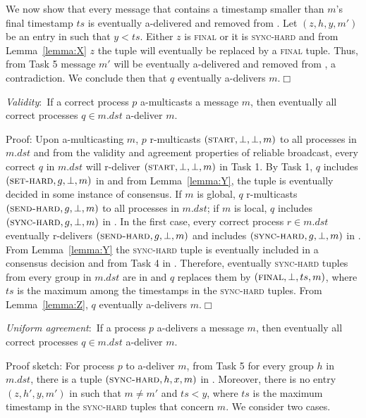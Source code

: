 We now show that every message that contains a timestamp smaller than $m$'s final timestamp $ts$ is eventually a-delivered and removed from \Buffer.
Let $(z,h,y,m')$ be an entry in \Buffer such that $y<ts$.
Either $z$ is \textsc{final} or it is \textsc{sync-hard} and from Lemma~\ref{lemma:X} $z$ the tuple will eventually be replaced by a \textsc{final} tuple.
Thus, from Task 5 message $m'$ will be eventually a-delivered and removed from \Buffer, a contradiction.
We conclude then that $q$ eventually a-delivers $m$.\hfill$\Box$

\setcounter{proposition}{3}
\begin{proposition}
\textit{Validity}:~If a correct process $p$ a-multicasts a message $m$, then eventually all correct processes $q \in m.\mathit{dst}$ a-deliver $m$.
\end{proposition}
\noindent
{\sc Proof:} 
Upon a-multicasting $m$, $p$ r-multicasts $(\textsc{start}, \bot, \bot, m)$ to all processes in $m.dst$ and from the validity and agreement properties of reliable broadcast, every correct $q$ in $m.dst$ will r-deliver $(\textsc{start}, \bot, \bot, m)$ in Task 1.
By Task 1, $q$ includes $(\textsc{set-hard}, g, \bot, m)$ in \Pend and from Lemma~\ref{lemma:Y}, the tuple is eventually decided in some instance of consensus.
If $m$ is global, $q$ r-multicasts $(\textsc{send-hard}, g, \bot, m)$ to all processes in $m.dst$; if $m$ is local, $q$ includes $(\textsc{sync-hard}, g, \bot, m)$ in \Buffer.
In the first case, every correct process $r \in m.dst$ eventually r-delivers $(\textsc{send-hard}, g, \bot, m)$ and includes $(\textsc{sync-hard}, g, \bot, m)$  in \Pend.
From Lemma~\ref{lemma:Y} the \textsc{sync-hard} tuple is eventually included in a consensus decision and from Task 4 in \Buffer.
Therefore, eventually \textsc{sync-hard} tuples from every group in $m.dst$ are in \Buffer and $q$ replaces them by $(\textsc{final}, \bot, ts, m)$, where $ts$ is the maximum among the timestamps in the \textsc{sync-hard} tuples.
From Lemma~\ref{lemma:Z}, $q$ eventually a-delivers $m$.\hfill$\Box$


\setcounter{proposition}{4}
\begin{proposition}
\textit{Uniform agreement}:~If a process $p$ a-delivers a message $m$, then eventually all correct processes $q\in m.\mathit{dst}$ a-deliver $m$.
\end{proposition}
\noindent
{\sc Proof sketch:} 
For process $p$ to a-deliver $m$, from Task 5 for every group $h$ in $m.dst$, there is a tuple $(\textsc{sync-hard}, h, x, m)$ in \Buffer.
Moreover, there is no entry $(z, h', y, m')$ in \Buffer such that $m \neq m'$ and $ts < y$, where $ts$ is the maximum timestamp in the \textsc{sync-hard} tuples that concern $m$.
We consider two cases.

